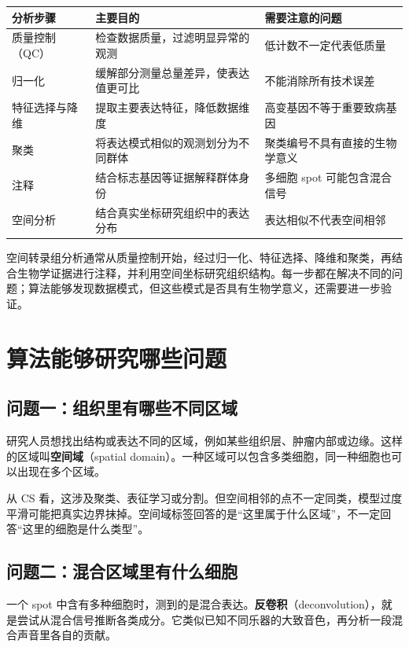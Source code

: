 \documentclass[UTF8,a4paper,11pt,fontset=fandol]{ctexart}
\newcommand{\term}[2]{{\color{accent}\textbf{#1}}（#2）}
\newcommand{\takeaway}[1]{\begin{tcolorbox}[learningstyle,title=本章要记住]#1\end{tcolorbox}}
\newcommand{\chapterstart}[1]{\clearpage\section{#1}}
\begin{document}
\begin{center}
\begin{tabularx}{\linewidth}{@{}p{2.4cm} Y Y@{}}
\toprule
{}
分析步骤 & 主要目的 & 需要注意的问题 \\
\midrule
质量控制（QC）
& 检查数据质量，过滤明显异常的观测
& 低计数不一定代表低质量 \\

归一化
& 缓解部分测量总量差异，使表达值更可比
& 不能消除所有技术误差 \\

特征选择与降维
& 提取主要表达特征，降低数据维度
& 高变基因不等于重要致病基因 \\

聚类
& 将表达模式相似的观测划分为不同群体
& 聚类编号不具有直接的生物学意义 \\

注释
& 结合标志基因等证据解释群体身份
& 多细胞 spot 可能包含混合信号 \\

空间分析
& 结合真实坐标研究组织中的表达分布
& 表达相似不代表空间相邻 \\
\bottomrule
\end{tabularx}
\end{center}

\endgroup

\takeaway{空间转录组分析通常从质量控制开始，经过归一化、特征选择、降维和聚类，再结合生物学证据进行注释，并利用空间坐标研究组织结构。每一步都在解决不同的问题；算法能够发现数据模式，但这些模式是否具有生物学意义，还需要进一步验证。}


\chapterstart{算法能够研究哪些问题}
\subsection{问题一：组织里有哪些不同区域}
研究人员想找出结构或表达不同的区域，例如某些组织层、肿瘤内部或边缘。这样的区域叫\term{空间域}{spatial domain}。一种区域可以包含多类细胞，同一种细胞也可以出现在多个区域。

从 CS 看，这涉及聚类、表征学习或分割。但空间相邻的点不一定同类，模型过度平滑可能把真实边界抹掉。空间域标签回答的是“这里属于什么区域”，不一定回答“这里的细胞是什么类型”。

\subsection{问题二：混合区域里有什么细胞}
一个 spot 中含有多种细胞时，测到的是混合表达。\term{反卷积}{deconvolution}，就是尝试从混合信号推断各类成分。它类似已知不同乐器的大致音色，再分析一段混合声音里各自的贡献。
\end{document}
